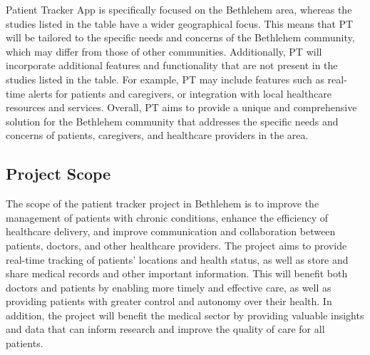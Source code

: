 \documentclass[12pt]{article}
\begin{document}
		 	\newpage
		 	Patient Tracker App is specifically focused on the Bethlehem area, whereas the studies listed in the table have a wider geographical focus. This means that PT will be tailored to the specific needs and concerns of the Bethlehem community, which may differ from those of other communities. Additionally, PT will incorporate additional features and functionality that are not present in the studies listed in the table. For example, PT may include features such as real-time alerts for patients and caregivers, or integration with local healthcare resources and services. Overall, PT aims to provide a unique and comprehensive solution for the Bethlehem community that addresses the specific needs and concerns of patients, caregivers, and healthcare providers in the area.\\
		\subsection{Project Scope}
			\quad The scope of the patient tracker project in Bethlehem is to improve the management of patients with chronic conditions, enhance the efficiency of healthcare delivery, and improve communication and collaboration between patients, doctors, and other healthcare providers. The project aims to provide real-time tracking of patients’ locations and health status, as well as store and share medical records and other important information. This will benefit both doctors and patients by enabling more timely and effective care, as well as providing patients with greater control and autonomy over their health. In addition, the project will benefit the medical sector by providing valuable insights and data that can inform research and improve the quality of care for all patients.\\
			
\end{document}
